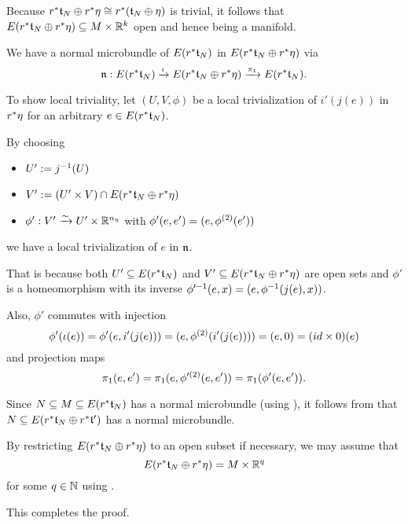\begin{scope}
\begin{myproof}
\begin{enumerate}
            Because $r^*\mathfrak{t}_N \oplus{} r^*\eta \cong r^*(\mathfrak{t}_N \oplus{} \eta)$ is trivial,
            it follows that $E(r^*\mathfrak{t}_N \oplus{} r^*\eta) \subseteq{} M \times \mathbb{R}^k$ open and hence being a manifold.

            We have a normal microbundle of $E(r^*\mathfrak{t}_N)$ in $E(r^*\mathfrak{t}_N \oplus{} r^*\eta)$ via
            \[ \mathfrak{n}: E(r^*\mathfrak{t}_N) \xrightarrow{\iota} E(r^*\mathfrak{t}_N \oplus{} r^*\eta) \xrightarrow{\pi_1} E(r^*\mathfrak{t}_N){}. \]

            To show local triviality,
            let $(U, V, \phi)$ be a local trivialization of $i'(j(e))$ in $r^*\eta$
            for an arbitrary $e \in E(r^*\mathfrak{t}_N)$.

            By choosing
            \begin{itemize}
                \item $U' := j^{-1}(U)$
                \item $V' := (U' \times V) \cap E(r^*\mathfrak{t}_N \oplus{} r^*\eta)$
                \item $\phi': V' \xrightarrow{\sim} U' \times \mathbb{R}^{n_\eta}$ with $\phi'(e, e') = (e, \phi^{(2)}(e'))$
            \end{itemize}
            we have a local trivialization of $e$ in $\mathfrak{n}$.

            That is because both $U' \subseteq{} E(r^*\mathfrak{t}_N)$ and $V' \subseteq{} E(r^*\mathfrak{t}_N \oplus{} r^*\eta)$ are open sets
            and $\phi'$ is a homeomorphism with its inverse $\phi'^{-1}(e, x) = (e, \phi^{-1}(j(e), x))$.
            
            Also, $\phi'$ commutes with injection
            \[ \phi'(\iota(e)) = \phi'(e, i'(j(e))) = (e, \phi^{(2)}(i'(j(e)))) = (e, 0) = (id \times 0)(e) \]
            and projection maps
            \[ \pi_1(e, e') = \pi_1(e, \phi'^{(2)}(e, e')) = \pi_1(\phi'(e, e')). \]
        \end{enumerate}
        Since $N \subseteq{} M \subseteq{} E(r^*\mathfrak{t}_N)$ has a normal microbundle (using ),
        it follows from  that
        $N \subseteq{} E(r^*\mathfrak{t}_N \oplus{} r^*\mathfrak{t}')$ has a normal microbundle.

        By restricting $E(r^*\mathfrak{t}_N \oplus{} r^*\eta)$ to an open subset if necessary, we may assume that
         \[ E(r^*\mathfrak{t}_N \oplus{} r^*\eta) = M \times \mathbb{R}^q \]
        for some $q \in \mathbb{N}$ using .

        This completes the proof.
    \end{myproof}
\end{scope}
